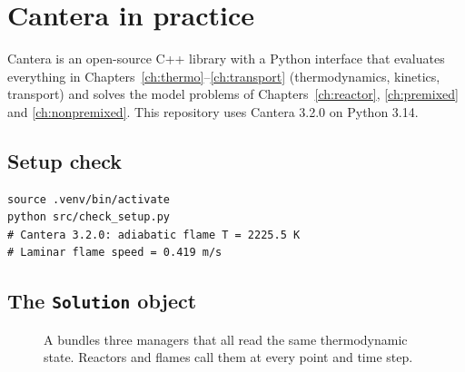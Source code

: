 \chapter{Cantera in practice}
\label{ch:cantera}

Cantera is an open-source C++ library with a Python interface that evaluates everything in
Chapters~\ref{ch:thermo}--\ref{ch:transport} (thermodynamics, kinetics, transport) and solves the model
problems of Chapters~\ref{ch:reactor}, \ref{ch:premixed} and \ref{ch:nonpremixed}. This repository uses
Cantera 3.2.0 on Python 3.14.

\section{Setup check}
\begin{lstlisting}
source .venv/bin/activate
python src/check_setup.py
# Cantera 3.2.0: adiabatic flame T = 2225.5 K
# Laminar flame speed = 0.419 m/s
\end{lstlisting}

\section{The \texttt{Solution} object}
\label{sec:ct-solution}

\begin{figure}[H]
\centering
{}
\caption{A  bundles three managers that all read the same thermodynamic state.
Reactors and flames call them at every point and time step.}
\end{figure}

